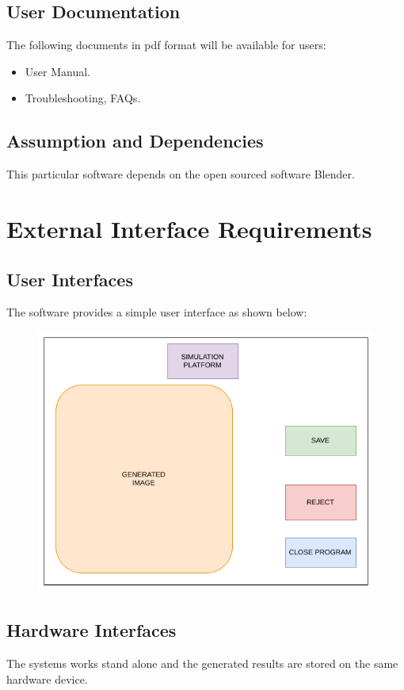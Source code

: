 \documentclass[a4paper,12pt]{article}
\begin{document}
\subsection{User Documentation}
The following documents in pdf format will be available for users:
\begin{itemize}
\item User Manual.
\item Troubleshooting, FAQs.
\end{itemize}
\subsection{Assumption and Dependencies}
This particular software depends on the open sourced software Blender.
\newpage

\section{External Interface Requirements}
\subsection{User Interfaces}
The software provides a simple user interface as shown below:
\begin{figure}[H]
\includegraphics[scale=0.75]{gui.png}
\end{figure}
\subsection{Hardware Interfaces}
The systems works stand alone and the generated results are stored on the same hardware device.
\end{document}
